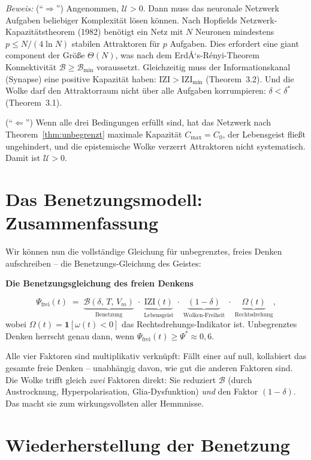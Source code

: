 ﻿\documentclass[12pt,a4paper]{report}
\theoremstyle{plain}
\theoremstyle{definition}
\theoremstyle{remark}
\begin{document}
	\textit{Beweis:}
	(``$\Rightarrow$'') Angenommen, $\mathcal{U} > 0$.
	Dann muss das neuronale Netzwerk Aufgaben beliebiger Komplexität lösen
	können. Nach Hopfields Netzwerk-Kapazitätstheorem (1982) benötigt
	ein Netz mit $N$ Neuronen mindestens $p \leq N/(4\ln N)$ stabilen
	Attraktoren für $p$ Aufgaben. Dies erfordert eine giant component der
	Größe $\Theta(N)$, was nach dem ErdÅ‘s-Rényi-Theorem Konnektivität
	$\mathcal{B} \geq \mathcal{B}_{\min}$ voraussetzt.
	Gleichzeitig muss der Informationskanal (Synapse) eine positive
	Kapazität haben: $\mathrm{IZI} > \mathrm{IZI}_{\min}$ (Theorem~3.2).
	Und die Wolke darf den Attraktorraum nicht über alle Aufgaben
	korrumpieren: $\delta < \delta^*$ (Theorem~3.1).

	(``$\Leftarrow$'') Wenn alle drei Bedingungen erfüllt sind,
	hat das Netzwerk nach Theorem~\ref{thm:unbegrenzt} maximale
	Kapazität $C_{\max} = C_0$, der Lebensgeist fließt ungehindert, und
	die epistemische Wolke verzerrt Attraktoren nicht systematisch.
	Damit ist $\mathcal{U} > 0$.
	\hfill

	\section{Das Benetzungsmodell: Zusammenfassung}

	Wir können nun die vollständige Gleichung für unbegrenztes,
	freies Denken aufschreiben -- die Benetzungs-Gleichung des Geistes:

	
	\noindent\textbf{Die Benetzungsgleichung des freien Denkens}

		\[
		\Psi_{\mathrm{frei}}(t)
		\;=\;
		\underbrace{\mathcal{B}(\delta,\,T,\,V_m)}_{\text{Benetzung}}
		\;\cdot\;
		\underbrace{\mathrm{IZI}(t)}_{\text{Lebensgeist}}
		\;\cdot\;
		\underbrace{(1-\delta)}_{\text{Wolken-Freiheit}}
		\;\cdot\;
		\underbrace{\Omega(t)}_{\text{Rechtsdrehung}},
		\]
		wobei $\Omega(t) = \mathbf{1}[\omega(t) < 0]$
		das Rechtsdrehungs-Indikator ist.
		Unbegrenztes Denken herrscht genau dann, wenn
		$\Psi_{\mathrm{frei}}(t) \geq \Psi^* \approx 0{,}6$.


	Alle vier Faktoren sind multiplikativ verknüpft:
	Fällt einer auf null, kollabiert das gesamte freie Denken --
	unabhängig davon, wie gut die anderen Faktoren sind.
	Die Wolke trifft gleich \emph{zwei} Faktoren direkt:
	Sie reduziert $\mathcal{B}$ (durch Austrocknung, Hyperpolarisation,
	Glia-Dysfunktion) \emph{und} den Faktor $(1-\delta)$.
	Das macht sie zum wirkungsvollsten aller Hemmnisse.

	\section{Wiederherstellung der Benetzung}
\end{document}
